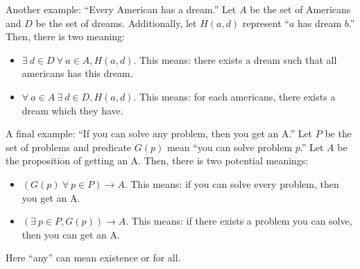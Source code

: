 \bigskip
Another example: ``Every American has a dream.'' Let \(A\) be the set of Americans and \(D\) be the set of dreams. Additionally, let \(H(a,d)\) represent
``\(a\) has dream \(b\).'' Then, there is two meaning:
\begin{itemize}
    \item \(\exists\: d\in D\:\forall\:a\in A, H(a,d)\). This means: there exists a dream such that all americans has this dream.
    \item \(\forall\: a\in A\:\exists\:d\in D, H(a,d)\). This means: for each americans, there exists a dream which they have.
\end{itemize}

\bigskip
A final example: ``If you can solve any problem, then you get an A.'' Let \(P\) be the set of problems and predicate \(G(p)\) mean ``you can solve problem \(p\).''
Let \(A\) be the proposition of getting an A. Then, there is two potential meanings:
\begin{itemize}
    \item \((G(p)\:\forall\:p\in P)\rightarrow A\). This means: if you can solve every problem, then you get an A.
    \item \((\exists\:p\in P, G(p))\rightarrow A\). This means: if there exists a problem you can solve, then you can get an A.
\end{itemize}
Here ``any'' can mean existence or for all. 